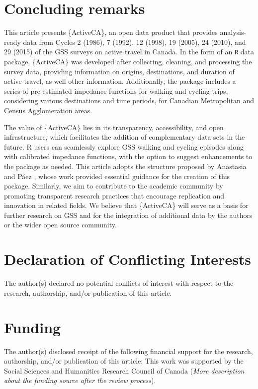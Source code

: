 \documentclass[Royal,times,sageh]{sagej}
\begin{document}
\section{Concluding remarks}\label{concluding-remarks}

This article presents \{ActiveCA\}, an open data product that provides
analysis-ready data from Cycles 2 (1986), 7 (1992), 12 (1998), 19
(2005), 24 (2010), and 29 (2015) of the GSS surveys on active travel in
Canada. In the form of an \texttt{R} data package, \{ActiveCA\} was
developed after collecting, cleaning, and processing the survey data,
providing information on origins, destinations, and duration of active
travel, as well other information. Additionally, the package includes a
series of pre-estimated impedance functions for walking and cycling
trips, considering various destinations and time periods, for Canadian
Metropolitan and Census Agglomeration areas.

The value of \{ActiveCA\} lies in its transparency, accessibility, and
open infrastructure, which facilitates the addition of complementary
data sets in the future. R users can seamlessly explore GSS walking and
cycling episodes along with calibrated impedance functions, with the
option to suggest enhancements to the package as needed. This article
adopts the structure proposed by Anastasia and Páez
\citeyearpar{soukhov2023}, whose work provided essential guidance for
the creation of this package. Similarly, we aim to contribute to the
academic community by promoting transparent research practices that
encourage replication and innovation in related fields. We believe that
\{ActiveCA\} will serve as a basis for further research on GSS and for
the integration of additional data by the authors or the wider open
source community.

\section{Declaration of Conflicting
Interests}\label{declaration-of-conflicting-interests}

The author(s) declared no potential conflicts of interest with respect
to the research, authorship, and/or publication of this article.

\section{Funding}\label{funding}

The author(s) disclosed receipt of the following financial support for
the research, authorship, and/or publication of this article: This work
was supported by the Social Sciences and Humanities Research Council of
Canada (\emph{More description about the funding source after the review
process}).
\end{document}
